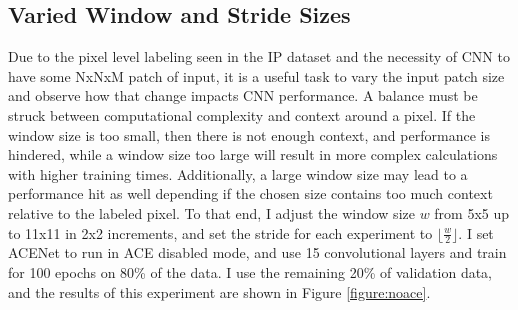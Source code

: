 \documentclass[12pt]{article}
\begin{document}
\subsection{Varied Window and Stride Sizes}
Due to the pixel level labeling seen in the IP dataset and the necessity of CNN to have some NxNxM patch of input, it is a useful task to vary the input patch size and observe how that change impacts CNN performance. 
%
A balance must be struck between computational complexity and context around a pixel.
%
If the window size is too small, then there is not enough context, and performance is hindered, while a window size too large will result in more complex calculations with higher training times.
%
Additionally, a large window size may lead to a performance hit as well depending if the chosen size contains too much context relative to the labeled pixel.
%
To that end, I adjust the window size $w$ from 5x5 up to 11x11 in 2x2 increments, and set the stride for each experiment to $\lfloor\frac{w}{2}\rfloor$. 
%
I set ACENet to run in ACE disabled mode, and use 15 convolutional layers and train for 100 epochs on 80\% of the data.
%
I use the remaining 20\% of validation data, and the results of this experiment are shown in Figure \ref{figure:noace}.
\end{document}
